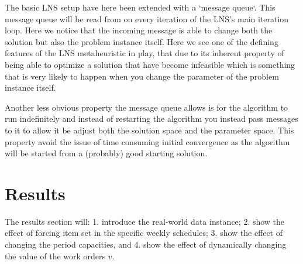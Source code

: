 \documentclass[preprint,12pt,authoryear]{elsarticle}
\begin{document}
The basic LNS setup have here been extended with a `message queue`. This message queue will be read from on every iteration of the LNS's main iteration loop. Here we notice that the incoming message is able to change both the solution but also the problem instance itself. Here we see one of the defining features of the LNS metaheuristic in play, that due to its inherent property of being able to optimize a solution that have become infeasible which is something that is very likely to happen when you change the parameter of the problem instance itself. 

Another less obvious property the message queue allows is for the algorithm to run indefinitely and instead of restarting the algorithm you instead pass messages to it to allow it be adjust both the solution space and the parameter space. This property avoid the issue of time consuming initial convergence as the algorithm will be started from a (probably) good starting solution.

\section{Results}
\label{sec:3-results}
The results section will: 1. introduce the real-world data instance; 2. show the effect of forcing item set in the specific weekly schedules; 3. show the effect of changing the 
period capacities, and 4. show the effect of dynamically changing the value of the work orders $v$. 
\end{document}
